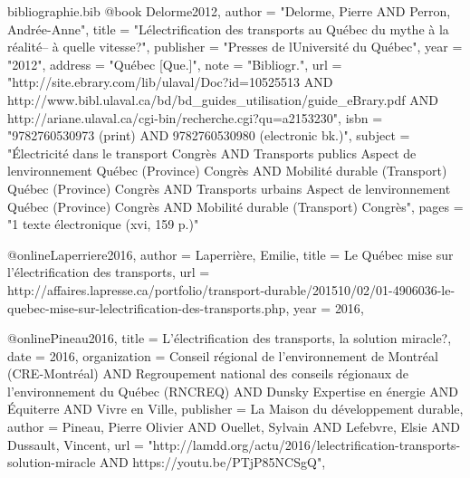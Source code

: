 
\begin{filecontents}{bibliographie.bib}
    @book {Delorme2012,
        author    = "Delorme, Pierre AND Perron, Andrée-Anne",
        title     = "L\textquotesingle électrification des transports au Québec du mythe à la réalité-- à quelle vitesse?",
        publisher = "Presses de l\textquotesingle Université du Québec",
        year      = "2012",
        address   = "Québec [Que.]",
        note      = "Bibliogr.",
        url       = "http://site.ebrary.com/lib/ulaval/Doc?id=10525513 AND http://www.bibl.ulaval.ca/bd/bd\_guides\_utilisation/guide\_eBrary.pdf AND http://ariane.ulaval.ca/cgi-bin/recherche.cgi?qu=a2153230",
        isbn      = "9782760530973 (print) AND 9782760530980 (electronic bk.)",
        subject   = "Électricité dans le transport Congrès AND Transports publics Aspect de l\textquotesingle environnement Québec (Province) Congrès AND Mobilité durable (Transport) Québec (Province) Congrès AND Transports urbains Aspect de l\textquotesingle environnement Québec (Province) Congrès AND Mobilité durable (Transport) Congrès",
        pages     = "1 texte électronique (xvi, 159 p.)"
    }

    @online{Laperriere2016,
        author = {Laperrière, Emilie},
        title  = {Le Québec mise sur l'électrification des transports},
        url    = {http://affaires.lapresse.ca/portfolio/transport-durable/201510/02/01-4906036-le-quebec-mise-sur-lelectrification-des-transports.php},
        year   = {2016},
    }

    @online{Pineau2016,
        title = {L'électrification des transports, la solution miracle?},
        date = {2016},
        organization = {Conseil régional de l’environnement de Montréal (CRE-Montréal) AND Regroupement national des conseils régionaux de l’environnement du Québec (RNCREQ) AND Dunsky Expertise en énergie AND Équiterre AND Vivre en Ville},
        publisher = {La Maison du développement durable},
        author = {Pineau, Pierre Olivier AND Ouellet, Sylvain AND Lefebvre, Elsie AND Dussault, Vincent},
        url = {"http://lamdd.org/actu/2016/lelectrification-transports-solution-miracle AND https://youtu.be/PTjP85NCSgQ"},
    }

\end{filecontents}
